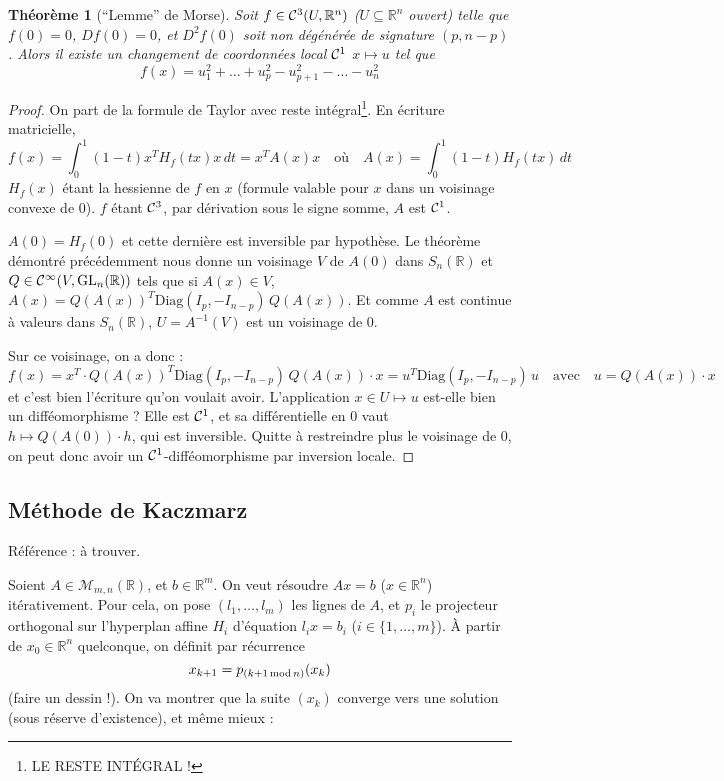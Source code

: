 \documentclass[a4paper, 11pt]{article}
\def\R{\mathbb{R}}
\def\Cf{{\cal{C}}}
\def\M{\mathcal{M}}
\def\GL{\mathrm{GL}}
\def\Diag{\mathrm{Diag}}
\newtheorem*{theorem}{Théorème}
\begin{document}
\begin{theorem}[\enquote{Lemme} de Morse]
  Soit $f \in \Cf^3(U, \R^n)$ ($U \subseteq \R^n$ ouvert) telle que $f(0) = 0$,
  $Df(0) = 0$, et $D^2f(0)$ soit non dégénérée de signature $(p,n-p)$. Alors il
  existe un changement de coordonnées local $\Cf^1$ $x \mapsto u$ tel que
  \[ f(x) = u_1^2 + \ldots + u_p^2 - u_{p+1}^2 - \ldots - u_n^2 \]
\end{theorem}
\begin{proof}
  On part de la formule de Taylor avec reste intégral\footnote{LE RESTE INTÉGRAL
    !}. En écriture matricielle,
  \[ f(x) = \int_0^1 (1-t)x^T H_f(tx) x\, dt = x^TA(x)x
    \quad \text{où} \quad A(x) = \int_0^1 (1-t) H_f(tx) \,dt  \]
  $H_f(x)$ étant la hessienne de $f$ en $x$ (formule valable pour $x$ dans un
  voisinage convexe de 0). $f$ étant $\Cf^3$, par dérivation sous le signe
  somme, $A$ est $\Cf^1$.

  $A(0) = H_f(0)$ et cette dernière est inversible par hypothèse. Le théorème
  démontré précédemment nous donne un voisinage $V$ de $A(0)$ dans $S_n(\R)$ et
  $Q \in \Cf^\infty(V, \GL_n(\R))$ tels que si $A(x) \in V$, $A(x) = Q(A(x))^T
  \Diag(I_p, -I_{n-p})\, Q(A(x))$. Et comme $A$ est continue à valeurs dans
  $S_n(\R)$, $U = A^{-1}(V)$ est un voisinage de $0$.

  Sur ce voisinage, on a donc :
  \[ f(x) = x^T \cdot Q(A(x))^T\Diag(I_p, -I_{n-p})\,Q(A(x)) \cdot x
    = u^T \Diag(I_p, -I_{n-p})\, u \quad \text{avec} \quad
    u = Q(A(x)) \cdot x
  \]
  et c'est bien l'écriture qu'on voulait avoir. L'application $x \in U \mapsto
  u$ est-elle bien un difféomorphisme ? Elle est $\Cf^1$, et sa différentielle
  en 0 vaut $h \mapsto Q(A(0)) \cdot h$, qui est inversible. Quitte à
  restreindre plus le voisinage de 0, on peut donc avoir un
  $\Cf^1$-difféomorphisme par inversion locale.
\end{proof}

\newpage

\subsection{Méthode de Kaczmarz}

Référence : à trouver.

Soient $A \in \M_{m,n}(\R)$, et $b \in \R^m$. On veut résoudre $Ax = b$ ($x \in
\R^n$) itérativement. Pour cela, on pose $(l_1, \ldots, l_m)$ les lignes de $A$,
et $p_i$ le projecteur orthogonal sur l'hyperplan affine $H_i$ d'équation $l_ix
= b_i$ ($i \in \{1, \ldots, m\}$). À partir de $x_0 \in \R^n$ quelconque, on
définit par récurrence
\[ x_{k+1} = p_{(k+1\, \textnormal{mod}\, n)}(x_k) \]
(faire un dessin !). On va montrer que la suite $(x_k)$ converge vers une
solution (sous réserve d'existence), et même mieux :
\end{document}
